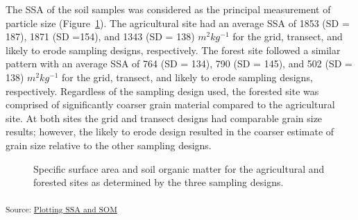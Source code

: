 \documentclass[
  number]{elsarticle}
\begin{document}
The SSA of the soil samples was considered as the principal measurement
of particle size (Figure~\ref{fig-ssasom-plot}). The agricultural site
had an average SSA of 1853 (SD = 187), 1871 (SD =154), and 1343 (SD =
138) \(m^2 kg^{-1}\) for the grid, transect, and likely to erode
sampling designs, respectively. The forest site followed a similar
pattern with an average SSA of 764 (SD = 134), 790 (SD = 145), and 502
(SD = 138) \(m^2 kg^{-1}\) for the grid, transect, and likely to erode
sampling designs, respectively. Regardless of the sampling design used,
the forested site was comprised of significantly coarser grain material
compared to the agricultural site. At both sites the grid and transect
designs had comparable grain size results; however, the likely to erode
design resulted in the coarser estimate of grain size relative to the
other sampling designs.

\begin{figure}[H]


\caption{\label{fig-ssasom-plot}Specific surface area and soil organic
matter for the agricultural and forested sites as determined by the
three sampling designs.}

\end{figure}%

\textsubscript{Source:
\href{https://alex-koiter.github.io/sampling-design-manuscript/notebooks/PSA_OM-preview.html\#cell-fig-ssasom-plot}{Plotting
SSA and SOM}}
\end{document}
